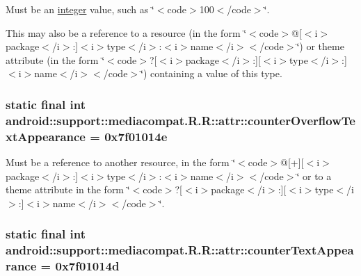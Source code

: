 Must be an \hyperlink{classandroid_1_1support_1_1mediacompat_1_1_r_1_1integer}{integer} value, such as \char`\"{}$<$code$>$100$<$/code$>$\char`\"{}. 

This may also be a reference to a resource (in the form \char`\"{}$<$code$>$@\mbox{[}$<$i$>$package$<$/i$>$:\mbox{]}$<$i$>$type$<$/i$>$:$<$i$>$name$<$/i$>$$<$/code$>$\char`\"{}) or theme attribute (in the form \char`\"{}$<$code$>$?\mbox{[}$<$i$>$package$<$/i$>$:\mbox{]}\mbox{[}$<$i$>$type$<$/i$>$:\mbox{]}$<$i$>$name$<$/i$>$$<$/code$>$\char`\"{}) containing a value of this type. \hypertarget{classandroid_1_1support_1_1mediacompat_1_1_r_1_1attr_2b2731d2577cd123313ef9f76b301936}{
\subsubsection[{counterOverflowTextAppearance}]{\setlength{\rightskip}{0pt plus 5cm}static final int android::support::mediacompat.R.R::attr::counterOverflowTextAppearance = 0x7f01014e}}
\label{classandroid_1_1support_1_1mediacompat_1_1_r_1_1attr_2b2731d2577cd123313ef9f76b301936}


Must be a reference to another resource, in the form \char`\"{}$<$code$>$@\mbox{[}+\mbox{]}\mbox{[}$<$i$>$package$<$/i$>$:\mbox{]}$<$i$>$type$<$/i$>$:$<$i$>$name$<$/i$>$$<$/code$>$\char`\"{} or to a theme attribute in the form \char`\"{}$<$code$>$?\mbox{[}$<$i$>$package$<$/i$>$:\mbox{]}\mbox{[}$<$i$>$type$<$/i$>$:\mbox{]}$<$i$>$name$<$/i$>$$<$/code$>$\char`\"{}. \hypertarget{classandroid_1_1support_1_1mediacompat_1_1_r_1_1attr_67588c3096dfd8014f1b37b162f8f38c}{
\subsubsection[{counterTextAppearance}]{\setlength{\rightskip}{0pt plus 5cm}static final int android::support::mediacompat.R.R::attr::counterTextAppearance = 0x7f01014d}}
\label{classandroid_1_1support_1_1mediacompat_1_1_r_1_1attr_67588c3096dfd8014f1b37b162f8f38c}



